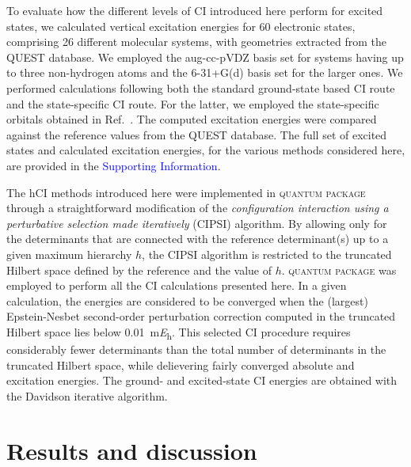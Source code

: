 \documentclass[aip,jcp,reprint,noshowkeys,superscriptaddress]{revtex4-1}
\newcommand{\SupInf}{\textcolor{blue}{Supporting Information}}
\newcommand{\QP}{\textsc{quantum package}}
\begin{document}
To evaluate how the different levels of CI introduced here perform for excited states,
we calculated vertical excitation energies for 60 electronic states, comprising 26 different molecular systems, with geometries extracted from the QUEST database. \cite{Veril_2021}
We employed the aug-cc-pVDZ basis set for systems having up to three non-hydrogen atoms and the 6-31+G(d) basis set for the larger ones.
We performed calculations following both the standard ground-state based CI route and the state-specific CI route. \cite{Kossoski_2023}
For the latter, we employed the state-specific orbitals obtained in Ref.~.
The computed excitation energies were compared against the reference values from the QUEST database. \cite{Veril_2021}
The full set of excited states and calculated excitation energies, for the various methods considered here, are provided in the {\SupInf}.

The hCI methods introduced here were implemented in {\QP} \cite{Garniron_2019} through a straightforward modification of the
\textit{configuration interaction using a perturbative selection made iteratively} (CIPSI) algorithm. \cite{Huron_1973,Giner_2013,Giner_2015,Garniron_2018}
By allowing only for the determinants that are connected with the reference determinant(s) up to a given maximum hierarchy $h$,
the CIPSI algorithm is restricted to the truncated Hilbert space defined by the reference and the value of $h$.
{\QP} \cite{Garniron_2019} was employed to perform all the CI calculations presented here.
In a given calculation, the energies are considered to be converged when the (largest) Epstein-Nesbet second-order perturbation correction computed in the truncated Hilbert space 
lies below \SI{0.01}{\milli\hartree}. \cite{Garniron_2018}
This selected CI procedure requires considerably fewer determinants than the total number of determinants in the truncated Hilbert space,
while delievering fairly converged absolute and excitation energies.
The ground- and excited-state CI energies are obtained with the Davidson iterative algorithm. \cite{Davidson_1975}



\section{Results and discussion}
\label{sec:res}
\end{document}
